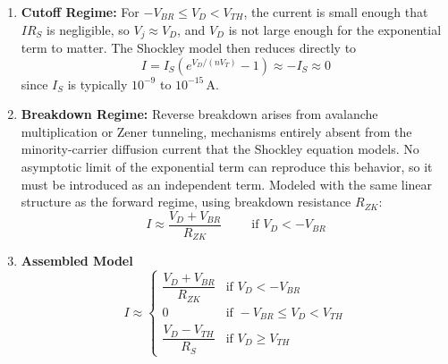 \begin{enumerate}
\begin{itemize}
\begin{enumerate}
            \[
              I \approx \frac{V_D - V_{TH}}{R_S} \hspace{1cm} \text{if } V_D \geq V_{TH}
            \]
          \item \textbf{Cutoff Regime:}
            For \(-V_{BR} \leq V_D < V_{TH}\), the current is small enough that
            \(I R_S\) is negligible, so \(V_j \approx V_D\), and \(V_D\) is not
            large enough for the exponential term to matter. The Shockley model
            then reduces directly to
            \[
              I = I_S \left( e^{V_D / (nV_T)} - 1 \right) \approx -I_S \approx 0
            \]
            since \(I_S\) is typically \(10^{-9}\) to \(10^{-15}\,\text{A}\).
          \item \textbf{Breakdown Regime:}
            Reverse breakdown arises from avalanche multiplication or Zener
            tunneling, mechanisms entirely absent from the minority-carrier
            diffusion current that the Shockley equation models. No asymptotic
            limit of the exponential term can reproduce this behavior, so it
            must be introduced as an independent term. Modeled with the same
            linear structure as the forward regime, using breakdown resistance
            \(R_{ZK}\):
            \[
              I \approx \frac{V_D + V_{BR}}{R_{ZK}} \hspace{1cm} \text{if } V_D < -V_{BR}
            \]
          \item \textbf{Assembled Model}
            \[
              I \approx
              \begin{cases}
                \dfrac{V_D + V_{BR}}{R_{ZK}} & \text{if } V_D < -V_{BR} \\[2mm]
                0 & \text{if } -V_{BR} \leq V_D < V_{TH} \\[2mm]
                \dfrac{V_D - V_{TH}}{R_S} & \text{if } V_D \geq V_{TH}
              \end{cases}
            \]
        \end{enumerate}
    \end{itemize}
\end{enumerate}

